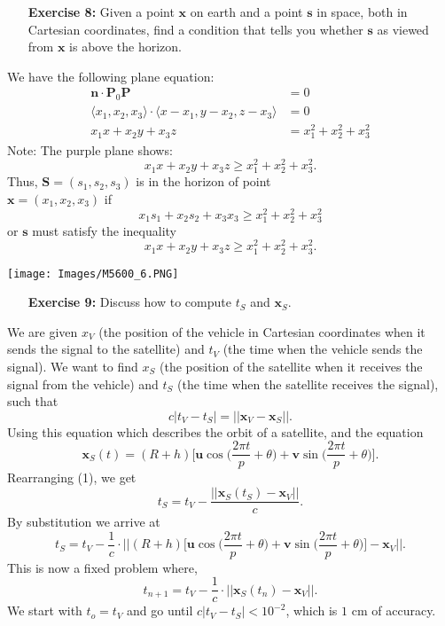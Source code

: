 \documentclass[11pt]{article}
\theoremstyle{definition}
\newcommand{\1}[1]{\mathbf{1} \left \{ #1 \right \}}
\begin{document}
\begin{itemize}
\item[{\textbf{Exercise 8:}}] Given a point $\textbf{x}$ on earth and a point $\textbf{s}$ in space, both in Cartesian coordinates, find a condition that tells you whether $\textbf{s}$ as viewed from $\textbf{x}$ is above the horizon.
\end{itemize}
\begin{minipage}{0.6\linewidth}
We have the following plane equation:
\begin{align*}
    \textbf{n} \cdot \textbf{P}_0\textbf{P} &= 0 \\
    \langle x_1, x_2, x_3 \rangle \cdot \langle x-x_1, y-x_2, z-x_3 \rangle &= 0 \\
    x_1x + x_2y + x_3z &= x_1^2 + x_2^2 + x_3^2
\end{align*}
Note: The purple plane shows:
\[x_1x + x_2y + x_3z \geq x_1^2 + x_2^2 + x_3^2.\]
Thus, $\textbf{S} = (s_1, s_2, s_3)$ is in the horizon of point \\
$\textbf{x} = (x_1, x_2, x_3)$ if
\[x_1s_1 + x_2s_2 + x_3x_3 \geq x_1^2 + x_2^2 + x_3^2\]
or $\textbf{s}$ must satisfy the inequality
\[x_1x + x_2y + x_3z \geq x_1^2 + x_2^2 + x_3^2.\]
\end{minipage}
\begin{minipage}{0.4\linewidth}
\texttt{[image: Images/M5600\_6.PNG]}
\end{minipage}

\begin{itemize}
\item[{\textbf{Exercise 9:}}] Discuss how to compute $t_S$ and $\textbf{x}_S$.
\end{itemize}
We are given $x_V$ (the position of the vehicle in Cartesian coordinates when it sends the signal to the satellite) and $t_V$ (the time when the vehicle sends the signal).  We want to find $x_S$ (the position of the satellite when it receives the signal from the vehicle) and $t_S$ (the time when the satellite receives the signal), such that
\begin{equation}
    c|t_V - t_S| = ||\textbf{x}_V - \textbf{x}_S||.
\end{equation}
Using this equation which describes the orbit of a satellite, and the equation
\begin{equation}
    \textbf{x}_S (t) = (R+h) \Bigg[\textbf{u}\cos \bigg(\frac{2\pi t}{p} + \theta \bigg) + \textbf{v}\sin \bigg(\frac{2\pi t}{p} + \theta \bigg)\Bigg].
\end{equation}
Rearranging (1), we get
\[t_S = t_V - \frac{\big|\big|\textbf{x}_S (t_S) - \textbf{x}_V\big|\big|}{c}.\]
By substitution we arrive at
\[t_S = t_V - \frac{1}{c} \cdot \Bigg|\Bigg|(R+h) \Bigg[\textbf{u}\cos \bigg(\frac{2\pi t}{p} + \theta \bigg) + \textbf{v}\sin \bigg(\frac{2\pi t}{p} + \theta \bigg)\Bigg] - \textbf{x}_V\Bigg|\Bigg|.\]
This is now a fixed problem where,
\[t_{n+1} = t_V - \frac{1}{c} \cdot \big|\big|\textbf{x}_S (t_n) - \textbf{x}_V\big|\big|.\]
We start with $t_o = t_V$ and go until \(c|t_V - t_S| < 10^{-2}\), which is $1$ cm of accuracy.
\end{document}

